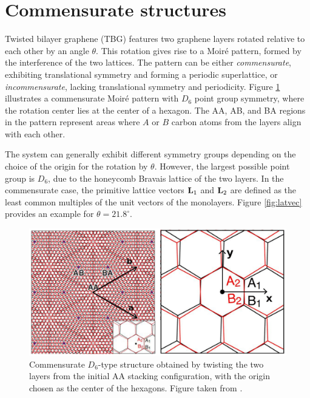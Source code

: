 \section{Commensurate structures} \label{sec:tbg_geom}

Twisted bilayer graphene (TBG) features two graphene layers rotated relative to each other by an angle \( \theta \). This rotation gives rise to a Moiré pattern, formed by the interference of the two lattices. The pattern can be either \textit{commensurate}, exhibiting translational symmetry and forming a periodic superlattice, or \textit{incommensurate}, lacking translational symmetry and periodicity. Figure \ref{fig:moireD6} illustrates a commensurate Moiré pattern with \( D_6 \) point group symmetry, where the rotation center lies at the center of a hexagon. The AA, AB, and BA regions in the pattern represent areas where \( A \) or \( B \) carbon atoms from the layers align with each other.

The system can generally exhibit different symmetry groups depending on the choice of the origin for the rotation by \( \theta \). However, the largest possible point group is \( D_6 \), due to the honeycomb Bravais lattice of the two layers. In the commensurate case, the primitive lattice vectors \( \vb{L}_1 \) and \( \vb{L}_2 \) are defined as the least common multiples of the unit vectors of the monolayers. Figure \ref{fig:latvec} provides an example for \( \theta = 21.8^\circ \).
\begin{figure}[H]
\centering
\includegraphics[height=.32\columnwidth]{fig/moireD6.png}
\caption{Commensurate $D_6$-type structure obtained by twisting the two layers from the initial AA stacking configuration, with the origin chosen as the center of the hexagons. Figure taken from \cite{thesis_rennella}.}
\label{fig:moireD6}
\end{figure}


